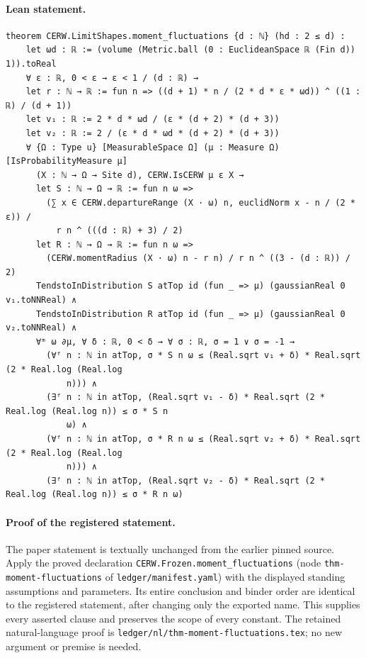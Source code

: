 \paragraph{Lean statement.}
\begin{verbatim}
theorem CERW.LimitShapes.moment_fluctuations {d : ℕ} (hd : 2 ≤ d) :
    let ωd : ℝ := (volume (Metric.ball (0 : EuclideanSpace ℝ (Fin d)) 1)).toReal
    ∀ ε : ℝ, 0 < ε → ε < 1 / (d : ℝ) →
    let r : ℕ → ℝ := fun n => ((d + 1) * n / (2 * d * ε * ωd)) ^ ((1 : ℝ) / (d + 1))
    let v₁ : ℝ := 2 * d * ωd / (ε * (d + 2) * (d + 3))
    let v₂ : ℝ := 2 / (ε * d * ωd * (d + 2) * (d + 3))
    ∀ {Ω : Type u} [MeasurableSpace Ω] (μ : Measure Ω) [IsProbabilityMeasure μ]
      (X : ℕ → Ω → Site d), CERW.IsCERW μ ε X →
      let S : ℕ → Ω → ℝ := fun n ω =>
        (∑ x ∈ CERW.departureRange (X · ω) n, euclidNorm x - n / (2 * ε)) /
          r n ^ (((d : ℝ) + 3) / 2)
      let R : ℕ → Ω → ℝ := fun n ω =>
        (CERW.momentRadius (X · ω) n - r n) / r n ^ ((3 - (d : ℝ)) / 2)
      TendstoInDistribution S atTop id (fun _ => μ) (gaussianReal 0 v₁.toNNReal) ∧
      TendstoInDistribution R atTop id (fun _ => μ) (gaussianReal 0 v₂.toNNReal) ∧
      ∀ᵐ ω ∂μ, ∀ δ : ℝ, 0 < δ → ∀ σ : ℝ, σ = 1 ∨ σ = -1 →
        (∀ᶠ n : ℕ in atTop, σ * S n ω ≤ (Real.sqrt v₁ + δ) * Real.sqrt (2 * Real.log (Real.log
            n))) ∧
        (∃ᶠ n : ℕ in atTop, (Real.sqrt v₁ - δ) * Real.sqrt (2 * Real.log (Real.log n)) ≤ σ * S n
            ω) ∧
        (∀ᶠ n : ℕ in atTop, σ * R n ω ≤ (Real.sqrt v₂ + δ) * Real.sqrt (2 * Real.log (Real.log
            n))) ∧
        (∃ᶠ n : ℕ in atTop, (Real.sqrt v₂ - δ) * Real.sqrt (2 * Real.log (Real.log n)) ≤ σ * R n ω)
\end{verbatim}
\paragraph{Proof of the registered statement.}
The paper statement is textually unchanged from the earlier pinned source.
Apply the proved declaration \texttt{CERW.Frozen.moment\_fluctuations}
(node \texttt{thm-moment-fluctuations} of \texttt{ledger/manifest.yaml}) with the displayed
standing assumptions and parameters. Its entire conclusion and binder order
are identical to the registered statement, after changing only the exported
name. This supplies every asserted clause and preserves the scope of every
constant. The retained natural-language proof is
\texttt{ledger/nl/thm-moment-fluctuations.tex}; no new argument or premise is needed.
